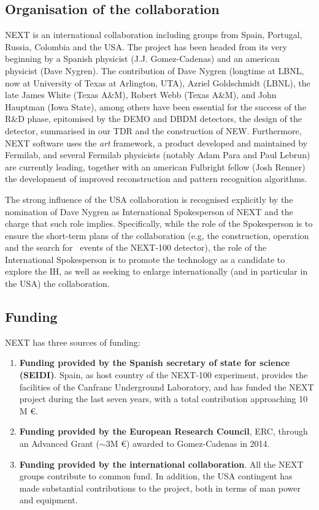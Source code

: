 
 \subsection{Organisation of the collaboration}
 
NEXT is an international collaboration including groups from Spain, Portugal, Russia, Colombia and the USA. The project has been headed from its very beginning by a Spanish physicist (J.J. Gomez-Cadenas) and an american physicist (Dave Nygren). The contribution of Dave Nygren (longtime at LBNL, now at University of Texas at Arlington, UTA), Azriel Goldschmidt (LBNL), the late James White (Texas A\&M), Robert Webb (Texas A\&M), and John Hauptman (Iowa State), among others have been essential for the success of the R\&D phase, epitomised by the DEMO and DBDM detectors, the design of the detector, summarised in our TDR \cite{Alvarez:2012sma} and the construction of NEW. Furthermore, NEXT software uses the {\em art} framework, a product developed and maintained by Fermilab, and several Fermilab physicists (notably Adam Para and Paul Lebrun) are currently leading, together with an american Fulbright fellow (Josh Renner) the development of improved reconstruction and pattern recognition algorithms. 

The strong influence of the USA collaboration is recognised explicitly by the nomination of Dave Nygren as International Spokesperson of NEXT and the charge that such role implies. Specifically, while the role of the Spokesperson is to ensure the short-term plans of the collaboration (e.g, the construction, operation and the search for \bbonu\ events of the NEXT-100 detector), the role of the International Spokesperson is to promote the technology as a candidate to explore the IH, as well as seeking to enlarge internationally (and in particular in the USA) the collaboration. 

\subsection{Funding}

NEXT has three sources of funding:
\begin{enumerate}
\item {\bf Funding provided by the Spanish secretary of state for science (SEIDI)}. Spain, as host country of the NEXT-100 experiment, provides the facilities of the Canfranc Underground Laboratory, and has funded the NEXT project during the last seven years, with a total contribution approaching 10 M \euro. 
\item {\bf Funding provided by the European Research Council}, ERC, through an Advanced Grant ($\sim 3$M \euro) awarded to Gomez-Cadenas in 2014.
\item {\bf Funding provided by the international collaboration}. All the NEXT groups contribute to common fund. In addition, the USA contingent has made substantial contributions to the project, both in terms of man power and equipment. 
\end{enumerate}


